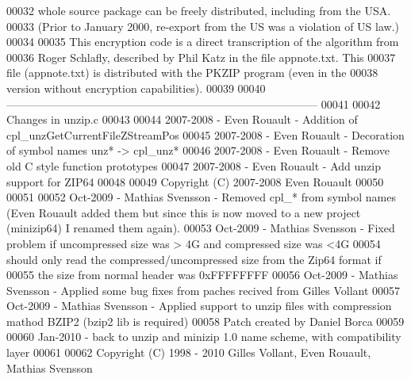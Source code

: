 \begin{DoxyCode}
00032 \textcolor{comment}{  whole source package can be freely distributed, including from the USA.}
00033 \textcolor{comment}{  (Prior to January 2000, re-export from the US was a violation of US law.)}
00034 \textcolor{comment}{}
00035 \textcolor{comment}{        This encryption code is a direct transcription of the algorithm from}
00036 \textcolor{comment}{  Roger Schlafly, described by Phil Katz in the file appnote.txt.  This}
00037 \textcolor{comment}{  file (appnote.txt) is distributed with the PKZIP program (even in the}
00038 \textcolor{comment}{  version without encryption capabilities).}
00039 \textcolor{comment}{}
00040 \textcolor{comment}{        ------------------------------------------------------------------------------------}
00041 \textcolor{comment}{}
00042 \textcolor{comment}{        Changes in unzip.c}
00043 \textcolor{comment}{}
00044 \textcolor{comment}{        2007-2008 - Even Rouault - Addition of cpl\_unzGetCurrentFileZStreamPos}
00045 \textcolor{comment}{  2007-2008 - Even Rouault - Decoration of symbol names unz* -> cpl\_unz*}
00046 \textcolor{comment}{  2007-2008 - Even Rouault - Remove old C style function prototypes}
00047 \textcolor{comment}{  2007-2008 - Even Rouault - Add unzip support for ZIP64}
00048 \textcolor{comment}{}
00049 \textcolor{comment}{        Copyright (C) 2007-2008 Even Rouault}
00050 \textcolor{comment}{}
00051 \textcolor{comment}{}
00052 \textcolor{comment}{        Oct-2009 - Mathias Svensson - Removed cpl\_* from symbol names (Even Rouault added them but since
       this is now moved to a new project (minizip64) I renamed them again).}
00053 \textcolor{comment}{  Oct-2009 - Mathias Svensson - Fixed problem if uncompressed size was > 4G and compressed size was <4G}
00054 \textcolor{comment}{                                should only read the compressed/uncompressed size from the Zip64 format if}
00055 \textcolor{comment}{                                the size from normal header was 0xFFFFFFFF}
00056 \textcolor{comment}{  Oct-2009 - Mathias Svensson - Applied some bug fixes from paches recived from Gilles Vollant}
00057 \textcolor{comment}{        Oct-2009 - Mathias Svensson - Applied support to unzip files with compression mathod BZIP2 (bzip2
       lib is required)}
00058 \textcolor{comment}{                                Patch created by Daniel Borca}
00059 \textcolor{comment}{}
00060 \textcolor{comment}{  Jan-2010 - back to unzip and minizip 1.0 name scheme, with compatibility layer}
00061 \textcolor{comment}{}
00062 \textcolor{comment}{  Copyright (C) 1998 - 2010 Gilles Vollant, Even Rouault, Mathias Svensson}

\end{DoxyCode}
